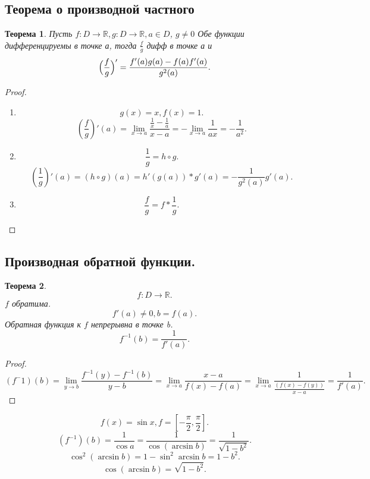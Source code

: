 \documentclass[a4paper]{scrartcl}
\newtheorem{theorem}{Теорема}
\begin{document}
\subsection{Теорема о производной частного}
\begin{theorem}
	Пусть $f: D \to \mathbb{R}, g: D \to \mathbb{R}, a \in D$, $g \neq 0$ Обе функции дифференцируемы в точке а, тогда $\frac{f}{g} $ дифф в точке а и
	\[
		\Big{(}\frac{f}{g}\Big{)}' = \frac{f'(a)g(a) - f(a)f'(a)}{g^2(a)}
		.\]
\end{theorem}
\begin{proof}
	\begin{enumerate}
		\item
		      \[
			      g(x) = x, f(x) = 1
			      .\]
		      \[
			      (\frac{f}{g})'(a) = \lim_{x \to a} \frac{\frac{1}{x} - \frac{1}{a}}{x - a} = -\lim_{x \to a} \frac{1}{ax} = -\frac{1}{a^2}
			      .\]
		\item
		      \[
			      \frac{1}{g} = h \circ g
			      .\]
		      \[
			      (\frac{1}{g})'(a) = (h \circ g)(a) = h'(g(a))*g'(a)= -\frac{1}{g^2(a)} g'(a)
			      .\]
		\item
		      \[
			      \frac{f}{g} = f * \frac{1}{g}
			      .\]
	\end{enumerate}
\end{proof}
\subsection{Производная обратной функции.}
\begin{theorem}
	\[
		f : D \to \mathbb{R}
		.\]
	$f$ обратима.
	\[
		f'(a) \neq 0, b = f(a)
		.\]
	Обратная функция к $f$ непрерывна в точке b.
	\[
		f^{-1}(b) = \frac{1}{f'(a)}
		.\]

\end{theorem}
\begin{proof}
	\[
		( f^-1 )(b) = \lim_{y \to b} \frac{f^{-1}(y) - f^{-1}(b)}{y - b} =
		\lim_{x \to a} \frac{x - a}{f(x)  -f(a)} = \lim_{x \to a} \frac{1}{\frac{(f(x) - f(y))}{x - a}}  = \frac{1}{f'(a)}
		.\]
\end{proof}
\[
	f(x) = \sin{x} , f = [-\frac{\pi}{2},\frac{\pi}{2}]
	.\]
\[
	(f^{-1})(b) = \frac{1}{\cos{a}} = \frac{1}{\cos{( \arcsin{b} )}} = \frac{1}{\sqrt{1 - b^2} }
	.\]
\[
	\cos^2{(\arcsin{b})} = 1 - \sin^2{\arcsin{b}} = 1 - b^2
	.\]
\[
	\cos{(\arcsin{b})} = \sqrt{1 - b^2}
	.\]
\end{document}
